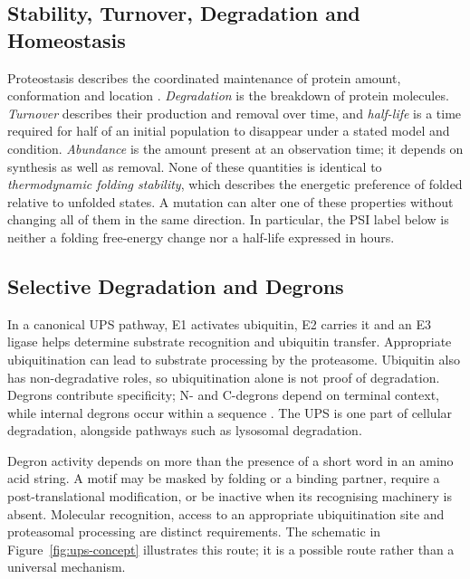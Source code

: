 \subsection{Stability, Turnover, Degradation and Homeostasis}
Proteostasis describes the coordinated maintenance of protein amount, conformation and location
\citep{balch2008}. \emph{Degradation} is the breakdown of protein molecules. \emph{Turnover}
describes their production and removal over time, and \emph{half-life} is a time required for half of an
initial population to disappear under a stated model and condition. \emph{Abundance} is the amount
present at an observation time; it depends on synthesis as well as removal. None of these quantities is
identical to \emph{thermodynamic folding stability}, which describes the energetic preference of
folded relative to unfolded states. A mutation can alter one of these properties without changing all
of them in the same direction. In particular, the PSI label below is neither a folding free-energy
change nor a half-life expressed in hours.

\subsection{Selective Degradation and Degrons}
In a canonical UPS pathway, E1 activates ubiquitin, E2 carries it and an E3 ligase helps determine
substrate recognition and ubiquitin transfer. Appropriate ubiquitination can lead to substrate
processing by the proteasome. Ubiquitin also has non-degradative roles, so ubiquitination alone is not
proof of degradation. Degrons contribute specificity; N- and C-degrons depend on terminal context,
while internal degrons occur within a sequence \citep{varshavsky2019,koren2018}. The UPS is one
part of cellular degradation, alongside pathways such as lysosomal degradation.

Degron activity depends on more than the presence of a short word in an amino acid string. A motif
may be masked by folding or a binding partner, require a post-translational modification, or be inactive
when its recognising machinery is absent. Molecular recognition, access to an appropriate
ubiquitination site and proteasomal processing are distinct requirements. The schematic in
Figure~\ref{fig:ups-concept} illustrates this route; it is a possible route rather than a universal mechanism.

